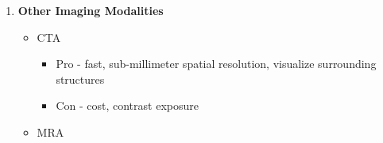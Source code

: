 \documentclass[
]{book}
\providecommand{\tightlist}{%
  \setlength{\itemsep}{0pt}\setlength{\parskip}{0pt}}
\begin{document}
\begin{enumerate}
  \begin{itemize}
  \item
    50-69\% stenosis of ICA - Low sensitivity for 50-69\% stenosis - a
    negative ultrasound in symptomatic patients necessitates
    additional imaging

    \begin{itemize}
    \tightlist
    \item
      PSV 125-229 cm/sec
    \item
      EDV 40-100
    \item
      Internal/Common Carotid PSV Ratio 2-4
    \end{itemize}
  \item
    70-99\% stenosis of ICA

    \begin{itemize}
    \item
      PSV \textgreater/= 230 cm/sec
    \item
      EDV \textgreater100 (EDV \textgreater{} 140 cm/sec most sensitive for stenosis \textgreater80\%)
    \item
      Internal/Common Carotid PSV Ratio \textgreater{} 4
    \end{itemize}
  \item
    Velocity-based estimation of carotid artery stenosis may need to
    be adjusted in certain circumstances

    \begin{itemize}
    \item
      Higher velocities in women than in men
    \item
      Higher velocities in the presence of contralateral carotid
      artery occlusion.
    \end{itemize}
  \item
    High carotid bifurcation, severe arterial tortuosity, extensive
    vascular calcification, and obesity may also reduce the accuracy
    of DUS imaging
  \end{itemize}
\item
  \textbf{Other Imaging Modalities}

  \begin{itemize}
  \item
    CTA

    \begin{itemize}
    \item
      Pro - fast, sub-millimeter spatial resolution, visualize
      surrounding structures
    \item
      Con - cost, contrast exposure
    \end{itemize}
  \item
    MRA


\end{itemize}
\end{enumerate}
\end{document}
